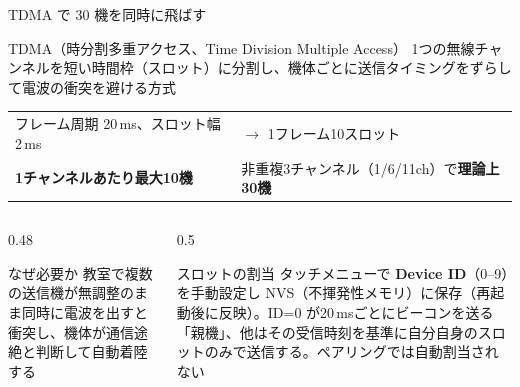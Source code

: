 \begin{frame}{TDMA で 30 機を同時に飛ばす}
  \begin{block}{TDMA（時分割多重アクセス、Time Division Multiple Access）}
    \footnotesize 1つの無線チャンネルを短い時間枠（スロット）に分割し、機体ごとに送信タイミングをずらして電波の衝突を避ける方式
  \end{block}

  \vspace{0.2em}

  \begin{table}
    \centering\footnotesize
    \begin{tabular}{ll}
      \hline
      フレーム周期 20\,ms、スロット幅 2\,ms & $\to$ 1フレーム10スロット \\
      \textbf{1チャンネルあたり最大10機} & 非重複3チャンネル（1/6/11ch）で\textbf{理論上30機} \\
      \hline
    \end{tabular}
  \end{table}

  \vspace{0.1em}

  \begin{columns}[T]
    \begin{column}{0.48\textwidth}
      \begin{alertblock}{なぜ必要か}
        \scriptsize 教室で複数の送信機が無調整のまま同時に電波を出すと衝突し、機体が通信途絶と判断して自動着陸する
      \end{alertblock}
    \end{column}
    \begin{column}{0.5\textwidth}
      \begin{exampleblock}{スロットの割当}
        \scriptsize タッチメニューで \textbf{Device ID}（0--9）を手動設定し NVS（不揮発性メモリ）に保存（再起動後に反映）。ID=0 が20\,msごとにビーコンを送る「親機」、他はその受信時刻を基準に自分自身のスロットのみで送信する。ペアリングでは自動割当されない
      \end{exampleblock}
    \end{column}
  \end{columns}

\end{frame}

